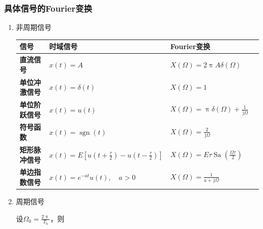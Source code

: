 \documentclass[UTF8,fontset=fandol,zihao=5]{ctexart}
\newcommand{\jj}{\,\mathrm{j}}
\begin{document}
\subsubsection{具体信号的Fourier变换}

\begin{enumerate}


  \item 非周期信号
    \begin{center}
    \begin{tabularx}{0.98\textwidth}{>{\bfseries}p{2.3cm}X X X}
    \toprule
    信号 & 时域信号 & Fourier变换 \\
    \midrule

    直流信号
    &
    $\displaystyle
    x(t)=A
    $
    &
    $\displaystyle
    X(\varOmega)
    =
    2\uppi A\delta(\varOmega)
    $
    \\

    单位冲激信号
    &
    $\displaystyle
    x(t)=\delta(t)
    $
    &
    $\displaystyle
    X(\varOmega)=1
    $
    \\

    单位阶跃信号
    &
    $\displaystyle
    x(t)=u(t)
    $
    &
    $\displaystyle
    X(\varOmega)
    =
    \uppi\delta(\varOmega)
    +
    \frac{1}{\jj\varOmega}
    $
    \\

    符号函数
    &
    $\displaystyle
    x(t)=\operatorname{sgn}(t)
    $
    &
    $\displaystyle
    X(\varOmega)
    =
    \frac{2}{\jj\varOmega}
    $
    \\

    矩形脉冲信号
    &
    $\displaystyle
    x(t)
    =
    E\left[
    u\left(t+\frac{\tau}{2}\right)
    -
    u\left(t-\frac{\tau}{2}\right)
    \right]
    $
    &
    $\displaystyle
    X(\varOmega)
    =
    E\tau
    \operatorname{Sa}
    \left(
    \frac{\varOmega\tau}{2}
    \right)
    $
    \\

    单边指数信号
    &
    $\displaystyle
    x(t)=e^{-at}u(t),
    \quad a>0
    $
    &
    $\displaystyle
    X(\varOmega)
    =
    \frac{1}{a+\jj\varOmega}
    $
    \\

    \bottomrule
    \end{tabularx}
    \end{center}
  
  \item 周期信号
  
    设$\displaystyle \varOmega_0=\frac{2\uppi}{T_0}$，则


\end{enumerate}
\end{document}
